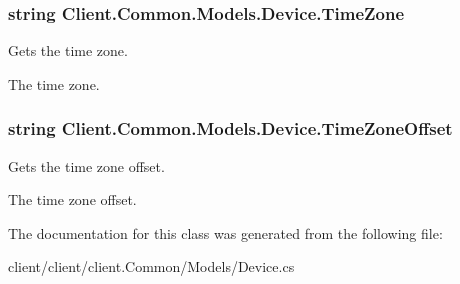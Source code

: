 \subsubsection[{Time\+Zone}]{\setlength{\rightskip}{0pt plus 5cm}string Client.\+Common.\+Models.\+Device.\+Time\+Zone\hspace{0.3cm}{\ttfamily [get]}}\label{classClient_1_1Common_1_1Models_1_1Device_a9809c0bb9a9868fe59b09afdf9b4fa30}


Gets the time zone. 

The time zone.\hypertarget{classClient_1_1Common_1_1Models_1_1Device_a3a837640c537f14a5a94b50fc9ccb535}{}
\subsubsection[{Time\+Zone\+Offset}]{\setlength{\rightskip}{0pt plus 5cm}string Client.\+Common.\+Models.\+Device.\+Time\+Zone\+Offset\hspace{0.3cm}{\ttfamily [get]}}\label{classClient_1_1Common_1_1Models_1_1Device_a3a837640c537f14a5a94b50fc9ccb535}


Gets the time zone offset. 

The time zone offset.

The documentation for this class was generated from the following file\+:\begin{DoxyCompactItemize}
\item 
client/client/client.\+Common/\+Models/Device.\+cs\end{DoxyCompactItemize}

